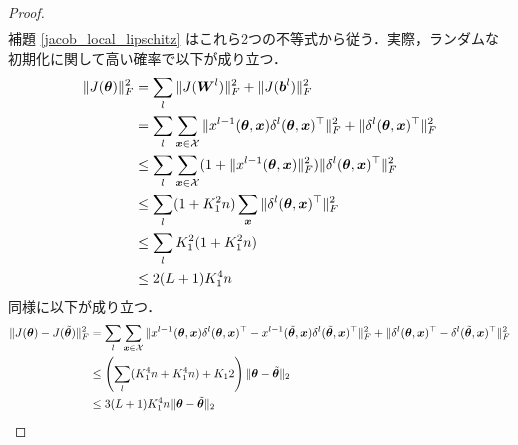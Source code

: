 \begin{proof}
\begin{align}
    \end{align}
    補題 \ref{jacob_local_lipschitz} はこれら2つの不等式から従う．実際，ランダムな初期化に関して高い確率で以下が成り立つ．
    \begin{align}
        \|J(\bm{\theta})\|_F^2 &= \sum_l \|J(\bm{W}^l)\|_F^2 + \|J(\bm{b}^l)\|_F^2 \\
        &= \sum_l \sum_{\bm{x} \in \mathcal{X}} \|x^{l-1}(\bm{\theta}, \bm{x})\delta^l (\bm{\theta}, \bm{x})^\top\|_F^2 + \|\delta^l (\bm{\theta}, \bm{x})^\top\|_F^2 \\
        &\leq \sum_l \sum_{\bm{x} \in \mathcal{X}} (1 + \|x^{l-1}(\bm{\theta}, \bm{x})\|_F^2)\|\delta^l (\bm{\theta}, \bm{x})^\top\|_F^2 \\
        &\leq \sum_l (1 + K_1^2 n)\sum_{\bm{x}} \|\delta^l (\bm{\theta}, \bm{x})^\top\|_F^2 \\
        &\leq \sum_l K_1^2 (1 + K_1^2 n) \\
        &\leq 2(L + 1)K_1^4 n
    \end{align}
    同様に以下が成り立つ．
    \begin{align}
        \|J(\bm{\theta}) - J(\tilde{\bm{\theta}})\|_F^2 &= \sum_l \sum_{\bm{x} \in \mathcal{X}} \|x^{l-1}(\bm{\theta}, \bm{x})\delta^l (\bm{\theta}, \bm{x})^\top - x^{l-1}(\tilde{\bm{\theta}}, \bm{x})\delta^l (\tilde{\bm{\theta}}, \bm{x})^\top\|_F^2 + \|\delta^l (\bm{\theta}, \bm{x})^\top - \delta^l (\tilde{\bm{\theta}}, \bm{x})^\top\|_F^2 \\
        &\leq \left(\sum_l (K_1^4 n + K_1^4 n) + K_12\right)\|\bm{\theta} - \tilde{\bm{\theta}}\|_2 \\
        &\leq 3(L + 1)K_1^4 n\|\bm{\theta} - \tilde{\bm{\theta}}\|_2
    \end{align}
\end{proof}

